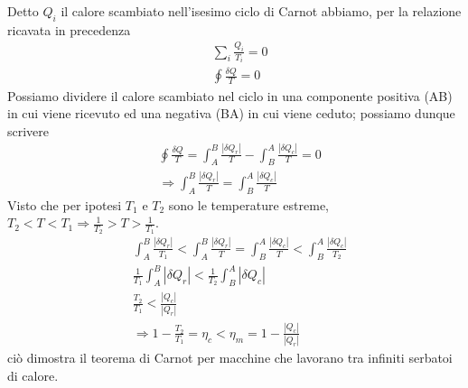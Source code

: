 \documentclass[10pt,a4paper]{article}
\begin{document}
\FloatBarrier
Detto \(Q_i\) il calore scambiato nell'isesimo ciclo di Carnot abbiamo, per la relazione ricavata in precedenza
\begin{align*}
	&\sum_i \frac{Q_i}{T_i} = 0\\
	&\oint \frac{\delta Q}{T} = 0
\end{align*}
Possiamo dividere il calore scambiato nel ciclo in una componente positiva (AB) in cui viene ricevuto ed una negativa (BA) in cui viene ceduto; possiamo dunque scrivere
\begin{align*}
	&\oint \frac{\delta Q}{T} = \int_A^B \frac{|\delta Q_r|}{T}- \int_B^A \frac{|\delta Q_c|}{T}= 0\\
	&\Rightarrow \int_A^B \frac{|\delta Q_r|}{T} = \int_B^A \frac{|\delta Q_c|}{T}
\end{align*}
Visto che per ipotesi \(T_1\) e \(T_2\) sono le temperature estreme, \(T_2<T<T_1 \Rightarrow \frac{1}{T_2}>T>\frac{1}{T_1}\).
\begin{align*}
	&\int_A^B \frac{|\delta Q_r|}{T_1} < \int_A^B \frac{|\delta Q_r|}{T} = \int_B^A \frac{|\delta Q_c|}{T} < \int_B^A \frac{|\delta Q_c|}{T_2}\\
	&\frac{1}{T_1} \int_A^B |\delta Q_r| < \frac{1}{T_2} \int_B^A |\delta Q_c|\\
	&\frac{T_2}{T_1} < \frac{|Q_c|}{|Q_r|}\\
	&\Rightarrow 1-\frac{T_2}{T_1} = \eta_c < \eta_m = 1-\frac{|Q_c|}{|Q_r|}
\end{align*} 
ciò dimostra il teorema di Carnot per macchine che lavorano tra infiniti serbatoi di calore. 
\end{document}
